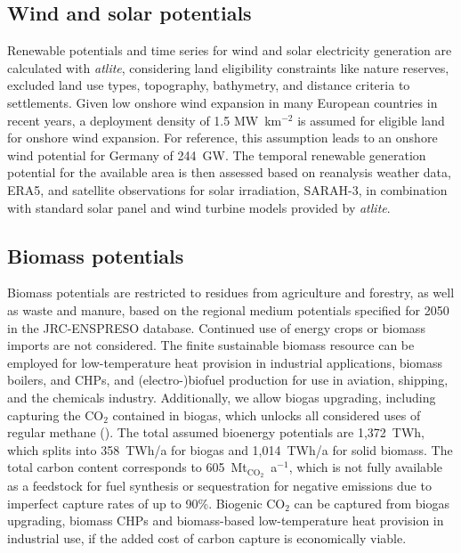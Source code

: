 \subsection*{Wind and solar potentials}
\label{sec:methods-wind-solar}

Renewable potentials and time series for wind and solar electricity generation
are calculated with \textit{atlite},\cite{hofmannAtliteLightweight2021}
considering land eligibility constraints like nature reserves, excluded land use
types, topography, bathymetry, and distance criteria to settlements. Given low
onshore wind expansion in many European countries in recent
years,\cite{ourworldindataInstalledWind2023} a deployment density of 1.5
MW~km$^{-2}$ is assumed for eligible land for onshore wind
expansion.\cite{turkovskaLanduseRequirementsSolar2023a} For reference, this
assumption leads to an onshore wind potential for Germany of 244~GW. The
temporal renewable generation potential for the available area is then assessed
based on reanalysis weather data, ERA5,\cite{ecmwf} and satellite observations
for solar irradiation, SARAH-3,\cite{pfeifrothSurfaceRadiationData2023} in
combination with standard solar panel and wind turbine models provided by
\textit{atlite}.

\subsection*{Biomass potentials}
\label{sec:methods-biomass}

Biomass potentials are restricted to residues from agriculture and forestry, as
well as waste and manure, based on the regional medium potentials specified for
2050 in the JRC-ENSPRESO database.\cite{ruizENSPRESOOpen2019} Continued use of
energy crops or biomass imports are not considered. The finite sustainable
biomass resource can be employed for low-temperature heat provision in
industrial applications, biomass boilers, and CHPs, and (electro-)biofuel
production for use in aviation, shipping, and the chemicals industry.
Additionally, we allow biogas upgrading, including capturing the CO$_2$
contained in biogas, which unlocks all considered uses of regular methane
(). The total assumed bioenergy
potentials are 1,372~TWh, which splits into 358~TWh/a for biogas and 1,014~TWh/a
for solid biomass. The total carbon content corresponds to
605~Mt$_{\text{CO}_2}$~a$^{-1}$, which is not fully available as a feedstock for
fuel synthesis or sequestration for negative emissions due to imperfect capture
rates of up to 90\%. Biogenic CO$_2$ can be captured from biogas upgrading,
biomass CHPs and biomass-based low-temperature heat provision in industrial use,
if the added cost of carbon capture is economically viable.

